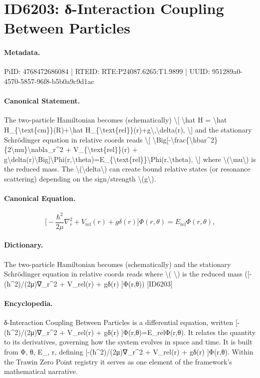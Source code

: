 \section*{ID6203: δ-Interaction Coupling Between Particles}
\paragraph{Metadata.}
PiID: 4768472686084 | RTEID: RTE:P24087.6265:T1.9899 | UUID: 951289a0-4570-5857-96f8-b5b0a9c9d1ac

\paragraph{Canonical Statement.}
The two-particle Hamiltonian becomes (schematically) \textbackslash{}[ \textbackslash{}hat H = \textbackslash{}hat H\_\{\textbackslash{}text\{cm\}\}(R)+\textbackslash{}hat H\_\{\textbackslash{}text\{rel\}\}(r)+g\textbackslash{},\textbackslash{}delta(r), \textbackslash{}] and the stationary Schrödinger equation in relative coords reads \textbackslash{}[ \textbackslash{}Big[-\textbackslash{}frac\{\textbackslash{}hbar\textasciicircum{}2\}\{2\textbackslash{}mu\}\textbackslash{}nabla\_r\textasciicircum{}2 + V\_\{\textbackslash{}text\{rel\}\}(r) + g\textbackslash{}delta(r)\textbackslash{}Big]\textbackslash{}Phi(r,\textbackslash{}theta)=E\_\{\textbackslash{}text\{rel\}\}\textbackslash{}Phi(r,\textbackslash{}theta), \textbackslash{}] where \textbackslash{}(\textbackslash{}mu\textbackslash{}) is the reduced mass. The \textbackslash{}(\textbackslash{}delta\textbackslash{}) can create bound relative states (or resonance scattering) depending on the sign/strength \textbackslash{}(g\textbackslash{}).

\paragraph{Canonical Equation.}
\[
\Big[-\frac{\hbar^2}{2\mu}\nabla_r^2 + V_{\text{rel}}(r) + g\delta(r)\Big]\Phi(r,\theta)=E_{\text{rel}}\Phi(r,\theta),
\]

\paragraph{Dictionary.}
The two-particle Hamiltonian becomes (schematically) and the stationary Schrödinger equation in relative coords reads where \textbackslash{}( \textbackslash{}) is the reduced mass ([-(ħ\textasciicircum{}2)/(2μ)∇\_r\textasciicircum{}2 + V\_rel(r) + gδ(r) ]Φ(r,θ)) [ID6203]

\paragraph{Encyclopedia.}
δ-Interaction Coupling Between Particles is a differential equation, written [-(ħ\textasciicircum{}2)/(2μ)∇\_r\textasciicircum{}2 + V\_rel(r) + gδ(r) ]Φ(r,θ)=E\_relΦ(r,θ). It relates the quantity to its derivatives, governing how the system evolves in space and time. It is built from Φ, θ, E\_, r, defining [-(ħ\textasciicircum{}2)/(2μ)∇\_r\textasciicircum{}2 + V\_rel(r) + gδ(r) ]Φ(r,θ). Within the Trawin Zero Point registry it serves as one element of the framework's mathematical narrative.
